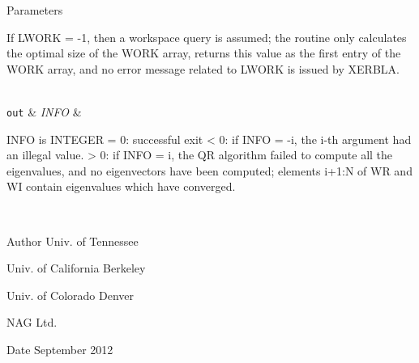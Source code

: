 \begin{DoxyParams}[1]{Parameters}
\begin{DoxyVerb}
          If LWORK = -1, then a workspace query is assumed; the routine
          only calculates the optimal size of the WORK array, returns
          this value as the first entry of the WORK array, and no error
          message related to LWORK is issued by XERBLA.\end{DoxyVerb}
\\
\hline
\mbox{\tt out}  & {\em I\+N\+F\+O} & \begin{DoxyVerb}          INFO is INTEGER
          = 0:  successful exit
          < 0:  if INFO = -i, the i-th argument had an illegal value.
          > 0:  if INFO = i, the QR algorithm failed to compute all the
                eigenvalues, and no eigenvectors have been computed;
                elements i+1:N of WR and WI contain eigenvalues which
                have converged.\end{DoxyVerb}
 \\
\hline
\end{DoxyParams}
\begin{DoxyAuthor}{Author}
Univ. of Tennessee 

Univ. of California Berkeley 

Univ. of Colorado Denver 

N\+A\+G Ltd. 
\end{DoxyAuthor}
\begin{DoxyDate}{Date}
September 2012 
\end{DoxyDate}
\hypertarget{group__doubleGEeigen_ga4e35e1d4e9b63ba9eef4ba8aff3debae}{}
